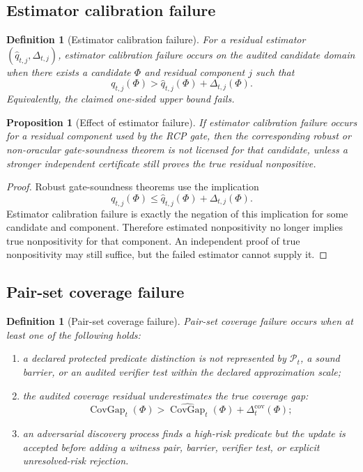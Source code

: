 \documentclass[11pt]{article}
\newtheorem{proposition}[theorem]{Proposition}
\newtheorem{definition}[theorem]{Definition}
\newcommand{\Pcal}{\mathcal{P}}
\newcommand{\1}{\mathbf{1}}
\begin{document}
\subsection{Estimator calibration failure}

\begin{definition}[Estimator calibration failure]
For a residual estimator \((\widehat q_{t,j},\Delta_{t,j})\), estimator calibration failure occurs on the audited candidate domain when there exists a candidate \(\Phi\) and residual component \(j\) such that
\[
q_{t,j}(\Phi)>
\widehat q_{t,j}(\Phi)+\Delta_{t,j}(\Phi).
\]
Equivalently, the claimed one-sided upper bound fails.
\end{definition}

\begin{proposition}[Effect of estimator failure]
If estimator calibration failure occurs for a residual component used by the RCP gate, then the corresponding robust or non-oracular gate-soundness theorem is not licensed for that candidate, unless a stronger independent certificate still proves the true residual nonpositive.
\end{proposition}

\begin{proof}
Robust gate-soundness theorems use the implication
\[
q_{t,j}(\Phi)\le \widehat q_{t,j}(\Phi)+\Delta_{t,j}(\Phi).
\]
Estimator calibration failure is exactly the negation of this implication for some candidate and component. Therefore estimated nonpositivity no longer implies true nonpositivity for that component. An independent proof of true nonpositivity may still suffice, but the failed estimator cannot supply it.
\end{proof}

\subsection{Pair-set coverage failure}

\begin{definition}[Pair-set coverage failure]
Pair-set coverage failure occurs when at least one of the following holds:
\begin{enumerate}[label=(\alph*)]
    \item a declared protected predicate distinction is not represented by \(\Pcal_t\), a sound barrier, or an audited verifier test within the declared approximation scale;
    \item the audited coverage residual underestimates the true coverage gap:
    \[
    \operatorname{CovGap}_t(\Phi)>
    \widehat{\operatorname{CovGap}}_t(\Phi)+\Delta_t^{\mathrm{cov}}(\Phi);
    \]
    \item an adversarial discovery process finds a high-risk predicate but the update is accepted before adding a witness pair, barrier, verifier test, or explicit unresolved-risk rejection.
\end{enumerate}
\end{definition}
\end{document}
